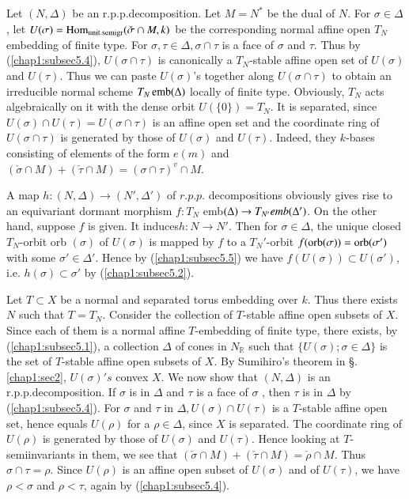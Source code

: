 \subsection{}\label{chap1:subsec5.7}%
\medskip
{}
Let $(N , \Delta)$ be an r.p.p.decomposition.
Let $M = N^*$ be the dual of $N$. For $\sigma \in \Delta$, let
$U(\sigma) = \operatorname{Hom}_{\text{unit.semigr}} (\check{\sigma} \cap M,k)$ be the
corresponding normal affine open $T_N$embedding of finite type. For
$\sigma , \tau \in \Delta , \sigma \cap \tau $ is a face of $\sigma$
and $\tau$. Thus by (\ref{chap1:subsec5.4}), $U(\sigma \cap \tau)$ is
canonically a 
$T_N$-stable affine open set of $U(\sigma)$ and $U(\tau)$. Thus we can
paste $U(\sigma)$'s together along $U(\sigma \cap \tau )$ to obtain an
irreducible normal scheme $T_N \operatorname{emb} (\Delta)$ locally of finite
type. Obviously, $T_N$ acts algebraically on it with the dense orbit
$U(\{ 0 \})= T_N$. It is separated, since $U(\sigma) \cap U(\tau) =
U(\sigma \cap \tau)$ is an affine open set and the coordinate ring of
$U(\sigma \cap \tau)   $ is generated by those of $U(\sigma)$ and
$U(\tau)$. Indeed, they $k$-bases consisting of elements of the form
$e(m)$ and $(\check{\sigma} \cap M) + (\check{\tau} \cap M)= (\sigma
\cap \tau)^v \cap M $. 


A map $h : ( N, \Delta) \to (N' , \Delta')$ of $r.p.p$. decompositions
obviously gives rise to an equivariant dormant morphism $f : T_N$
emb$(\Delta) \to T_{N'}\break emb (\Delta')$. On the other hand, suppose $f$ is
given. It induces\pageoriginale $h: N \to N'$. Then for $ \sigma \in
\Delta$, the 
unique closed $T_N$-orbit orb $(\sigma)$ of $U (\sigma)$ is mapped by
$f$ to a $T_N'$-orbit $f(\operatorname{orb}(\sigma))=  \operatorname{orb} (\sigma')$ with some
$\sigma' \in \Delta'$. Hence by (\ref{chap1:subsec5.5}) we have
$f(U(\sigma)) \subset 
U (\sigma')$, i.e. $h (\sigma) \subset \sigma' $ by (\ref{chap1:subsec5.2}).  

Let $T \subset X$ be a normal and separated torus embedding over
$k$. Thus there exists $N$ such that $T= T_N$. Consider the collection
of $T$-stable affine open subsets of $X$. Since each of them is a
normal affine $T$-embedding of finite type, there exists, by
(\ref{chap1:subsec5.1}), 
a collection $\Delta$ of cones in $N_{\mathbb{R}}$ such that $\{
U(\sigma) ; \sigma \in \Delta \}$ is the set of $T$-stable affine open
subsets of $X$. By Sumihiro's theorem in \S. \ref{chap1:sec2},
$U(\sigma)'s$ convex 
 $X$. We now show that $(N, \Delta)$ is an
r.p.p.decomposition. If $\sigma$ is in $\Delta$ and $\tau$ is a
face of $\sigma$ , then $\tau$ is in $\Delta$ by
(\ref{chap1:subsec5.4}). For $\sigma$ 
and $\tau$ in $\Delta , U(\sigma) \cap U(\tau)$ is a $T$-stable affine
open set, hence equals $U(\rho)$ for a $\rho \in \Delta$, since $X$ is
separated. The coordinate ring of $U(\rho)$ is generated by those of
$U(\sigma)$ and $U(\tau)$. Hence looking at $T$-semiinvariants in
them, we see that $(\check{\sigma} \cap M)+  (\check{\tau} \cap M) =
\check{\rho} \cap M$. Thus $\sigma \cap \tau = \rho $. Since $U(\rho)$
is an affine open subset of $U(\sigma)$ and of $U(\tau)$, we have
$\rho < \sigma$ and $\rho < \tau$, again by (\ref{chap1:subsec5.4}). 

